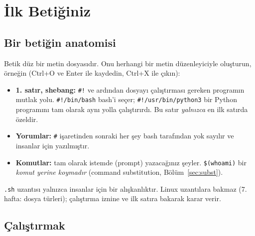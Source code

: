 \section{İlk Betiğiniz}

\subsection{Bir betiğin anatomisi}

Betik düz bir metin dosyasıdır. Onu herhangi bir metin düzenleyiciyle oluşturun, örneğin  (Ctrl+O ve Enter ile kaydedin, Ctrl+X ile çıkın):



\begin{itemize}
  \item \textbf{1. satır, shebang:} \texttt{\#!} ve ardından dosyayı çalıştırması gereken programın mutlak yolu. \texttt{\#!/bin/bash} bash'i seçer; \texttt{\#!/usr/bin/python3} bir Python programını tam olarak aynı yolla çalıştırırdı. Bu satır \emph{yalnızca} en ilk satırda özeldir.
  \item \textbf{Yorumlar:} \texttt{\#} işaretinden sonraki her şey bash tarafından yok sayılır ve insanlar için yazılmıştır.
  \item \textbf{Komutlar:} tam olarak istemde (prompt) yazacağınız şeyler. \texttt{\$(whoami)} bir \emph{komut yerine koymadır} (command substitution, Bölüm~\ref{sec:subst}).
\end{itemize}
\texttt{.sh} uzantısı yalnızca insanlar için bir alışkanlıktır. Linux uzantılara bakmaz (7. hafta: dosya türleri); çalıştırma iznine ve ilk satıra bakarak karar verir.

\subsection{Çalıştırmak}
\label{sec:running}




